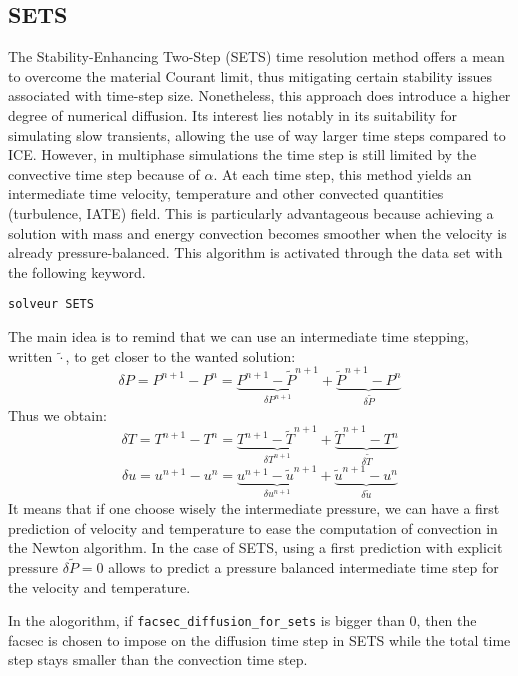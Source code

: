\subsection{SETS}
The Stability-Enhancing Two-Step (SETS) \cite{MAHAFFY1982329} time resolution method offers a mean to overcome the material Courant limit, thus mitigating certain stability issues associated with time-step size. Nonetheless, this approach does introduce a higher degree of numerical diffusion. Its interest lies notably in its suitability for simulating slow transients, allowing the use of way larger time steps compared to ICE. However, in multiphase simulations the time step is still limited by the convective time step because of $\alpha$. At each time step, this method yields an intermediate time velocity, temperature and other convected quantities (turbulence, IATE) field. This is particularly advantageous because achieving a solution with mass and energy convection becomes smoother when the velocity is already pressure-balanced. This algorithm is activated through the data set with the following keyword.
\begin{lstlisting}
solveur SETS
\end{lstlisting}
The main idea is to remind that we can use an intermediate time stepping, written $\widetilde{\cdot}$, to get closer to the wanted solution: 
\begin{equation}
    \delta P=P^{n+1}-P^n= \underbrace{P^{n+1}- \widetilde{P}^{n+1}}_{\delta P^{n+1}}+\underbrace{\widetilde{P}^{n+1}-P^{n}}_{\delta \widetilde{P}}
\end{equation}
Thus we obtain:
\begin{equation}
    \delta T=T^{n+1}-T^n= \underbrace{T^{n+1}- \widetilde{T}^{n+1}}_{\delta T^{n+1}}+\underbrace{\widetilde{T}^{n+1}-T^{n}}_{\delta \widetilde{T}}
\end{equation}
\begin{equation}
    \delta u=u^{n+1}-u^n= \underbrace{u^{n+1}- \widetilde{u}^{n+1}}_{\delta u^{n+1}}+\underbrace{\widetilde{u}^{n+1}-u^{n}}_{\delta \widetilde{u}}
\end{equation}
It means that if one choose wisely the intermediate pressure, we can have a first prediction of velocity and temperature to ease the computation of convection in the Newton algorithm. In the case of SETS, using a first prediction with explicit pressure $\delta \widetilde{P}=0$ allows to predict a pressure balanced intermediate time step for the velocity and temperature.

In the alogorithm, if \texttt{facsec_diffusion_for_sets} is bigger than 0, then the facsec is chosen to impose on the diffusion time step in SETS while the total time step stays smaller than the convection time step.


